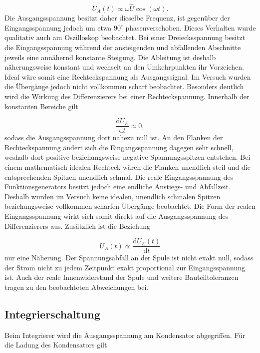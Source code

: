 \documentclass{report}
\begin{document}
\begin{equation}
U_A(t)\propto\omega\hat{U}\cos(\omega t).
\end{equation}
\noindent
Die Ausgangsspannung besitzt daher dieselbe Frequenz, ist gegenüber der Eingangsspannung jedoch um etwa $90^\circ$ phasenverschoben. Dieses Verhalten wurde qualitativ auch am Oszilloskop beobachtet.
\noindent
Bei einer Dreiecksspannung besitzt die Eingangsspannung während der ansteigenden und abfallenden Abschnitte jeweils eine annähernd konstante Steigung. Die Ableitung ist deshalb näherungsweise konstant und wechselt an den Umkehrpunkten ihr Vorzeichen. Ideal wäre somit eine Rechteckspannung als Ausgangssignal. Im Versuch wurden die Übergänge jedoch nicht vollkommen scharf beobachtet.
\noindent
Besonders deutlich wird die Wirkung des Differenzierers bei einer Rechteckspannung. Innerhalb der konstanten Bereiche gilt

\begin{equation}
\frac{\mathrm{d}U_E}{\mathrm{d}t}\approx0,
\end{equation}
\noindent
sodass die Ausgangsspannung dort nahezu null ist. An den Flanken der Rechteckspannung ändert sich die Eingangsspannung dagegen sehr schnell, weshalb dort positive beziehungsweise negative Spannungsspitzen entstehen.
\noindent
Bei einem mathematisch idealen Rechteck wären die Flanken unendlich steil und die entsprechenden Spitzen unendlich schmal. Die reale Eingangsspannung des Funktionsgenerators besitzt jedoch eine endliche Anstiegs- und Abfallzeit. Deshalb wurden im Versuch keine idealen, unendlich schmalen Spitzen beziehungsweise vollkommen scharfen Übergänge beobachtet. Die Form der realen Eingangsspannung wirkt sich somit direkt auf die Ausgangsspannung des Differenzierers aus.
\noindent
Zusätzlich ist die Beziehung

\begin{equation}
U_A(t)\propto\frac{\mathrm{d}U_E(t)}{\mathrm{d}t}
\end{equation}
\noindent
nur eine Näherung. Der Spannungsabfall an der Spule ist nicht exakt null, sodass der Strom nicht zu jedem Zeitpunkt exakt proportional zur Eingangsspannung ist. Auch der reale Innenwiderstand der Spule und weitere Bauteiltoleranzen tragen zu den beobachteten Abweichungen bei.

\subsection{Integrierschaltung}
\noindent
Beim Integrierer wird die Ausgangsspannung am Kondensator abgegriffen. Für die Ladung des Kondensators gilt
\end{document}
